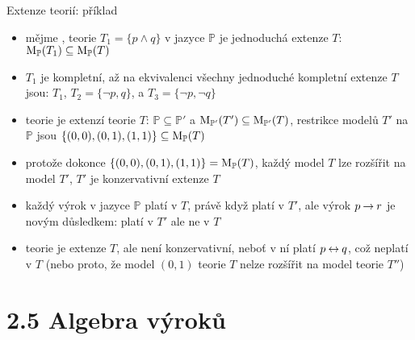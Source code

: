 \documentclass{beamer}
\begin{document}
\begin{frame}{Extenze teorií: příklad}

    \small
    \begin{itemize}[<+->]
        \item mějme , teorie $T_1=\{p\land q\}$ v jazyce $\mathbb P$ \alert{je jednoduchá} extenze $T$: $\operatorname{M}_\mathbb P(T_1)\subseteq\operatorname{M}_\mathbb P(T)$
        \item $T_1$ je kompletní, až na ekvivalenci všechny jednoduché kompletní extenze $T$ jsou: $T_1$, $T_2=\{\neg p,q\}$, a $T_3=\{\neg p,\neg q\}$
        \item teorie  je extenzí teorie $T$: $\mathbb P\subseteq\mathbb P'$ a $\operatorname{M}_{\mathbb P'}(T')\subseteq\operatorname{M}_{\mathbb P'}(T)$, restrikce modelů $T'$ na $\mathbb P$ jsou $\{(0,0),(0,1),(1,1)\}\subseteq\operatorname{M}_\mathbb P(T)$
        
        \item protože dokonce $\{(0,0),(0,1),(1,1)\}=\operatorname{M}_\mathbb P(T)$, každý model $T$ lze rozšířit na model $T'$, $T'$ \alert{je konzervativní} extenze $T$
        \item každý výrok v jazyce $\mathbb P$ platí v $T$, právě když platí v $T'$, ale výrok $p\mathbin{\rightarrow} r$ je novým důsledkem: platí v $T'$ ale ne v $T$
        \item teorie  je extenze $T$, ale \alert{není konzervativní}, neboť v ní platí $p\mathbin{\leftrightarrow} q$, což neplatí v $T$ (nebo proto, že model $(0, 1)$ teorie $T$ nelze rozšířit na model teorie $T''$)
    \end{itemize}
 
\end{frame}


\section{2.5 Algebra výroků}
\end{document}

